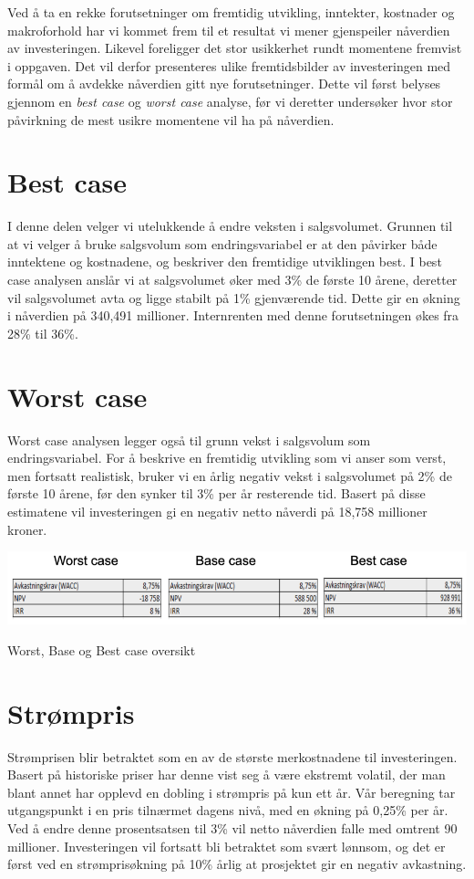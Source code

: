 Ved å ta en rekke forutsetninger om fremtidig utvikling, inntekter, kostnader og makroforhold har vi kommet frem til et resultat vi mener gjenspeiler nåverdien av investeringen. Likevel foreligger det stor usikkerhet rundt momentene fremvist i oppgaven. Det vil derfor presenteres ulike fremtidsbilder av investeringen med formål om å avdekke nåverdien gitt nye forutsetninger. Dette vil først belyses gjennom en \textit{best case} og \textit{worst case} analyse, før vi deretter undersøker hvor stor påvirkning de mest usikre momentene vil ha på nåverdien.

\section{Best case}
I denne delen velger vi utelukkende å endre veksten i salgsvolumet. Grunnen til at vi velger å bruke salgsvolum som endringsvariabel er at den påvirker både inntektene og kostnadene, og beskriver den fremtidige utviklingen best. I best case analysen anslår vi at salgsvolumet øker med 3\% de første 10 årene, deretter vil salgsvolumet avta og ligge stabilt på 1\% gjenværende tid. Dette gir en økning i nåverdien på 340,491 millioner. Internrenten med denne forutsetningen økes fra 28\% til 36\%.

\section{Worst case}
Worst case analysen legger også til grunn vekst i salgsvolum som endringsvariabel. For å beskrive en fremtidig utvikling som vi anser som verst, men fortsatt realistisk, bruker vi en årlig negativ vekst i salgsvolumet på 2\% de første 10 årene, før den synker til 3\% per år resterende tid. Basert på disse estimatene vil investeringen gi en negativ netto nåverdi på 18,758 millioner kroner.

\begin{table}[H]
  \includegraphics[width=\linewidth]{tabeller/case.png}
  \caption{Worst, Base og Best case oversikt}
  \label{tbl:case}
\end{table}

\section{Strømpris}
Strømprisen blir betraktet som en av de største merkostnadene til investeringen. Basert på historiske priser har denne vist seg å være ekstremt volatil, der man blant annet har opplevd en dobling i strømpris på kun ett år. Vår beregning tar utgangspunkt i en pris tilnærmet dagens nivå, med en økning på 0,25\% per år. Ved å endre denne prosentsatsen til 3\% vil netto nåverdien falle med omtrent 90 millioner. Investeringen vil fortsatt bli betraktet som svært lønnsom, og det er først ved en strømprisøkning på 10\% årlig at prosjektet gir en negativ avkastning.

